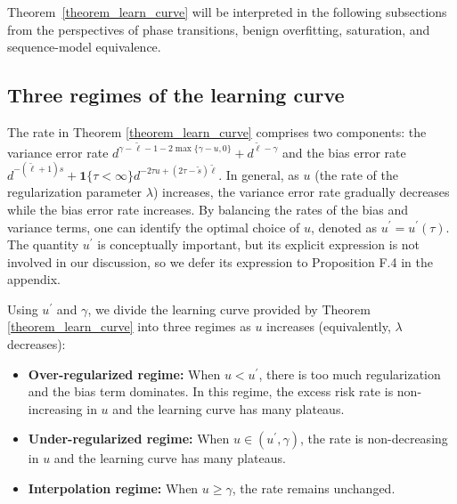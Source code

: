 \documentclass{article}
\theoremstyle{plain}
\theoremstyle{definition}
\theoremstyle{remark}
\begin{document}

Theorem~\ref{theorem_learn_curve} will be interpreted in the following subsections from the perspectives of phase transitions, benign overfitting, saturation, and sequence-model equivalence.


\subsection{Three regimes of the learning curve} 
The rate in Theorem \ref{theorem_learn_curve} comprises two components: the variance error rate $d^{\gamma - \tilde{\ell} - 1 - 2  \max\{\gamma - u, 0\}}
+ d^{\tilde{\ell} - \gamma}$ and the bias error rate $d^{-(\tilde{\ell} + 1)  s}
+ \mathbf{1}\{\tau<\infty\} d^{-2  \tau  u + (2  \tau - \tilde{s})  \tilde{\ell}}$.
In general, as $u$ (the rate of the regularization parameter $\lambda$) increases, the variance error rate gradually decreases while the bias error rate increases. 
By balancing the rates of the bias and variance terms, one can identify the optimal choice of $u$, denoted as $u^{\prime} = u^{\prime}(\tau)$. 
The quantity $u^{\prime}$ is conceptually important, but its explicit expression is not involved in our discussion, so we defer its expression to Proposition F.4 in the appendix.  


Using $u^{\prime}$ and $\gamma$, we divide the learning curve provided by Theorem \ref{theorem_learn_curve} into three regimes as $u$ increases (equivalently, $\lambda$ decreases):
\begin{itemize}
    \item {\bf Over-regularized regime: } When $u < u^{\prime}$, there is too much regularization and the bias term dominates. In this regime, the excess risk rate is non-increasing in $u$ and the learning curve has many plateaus.
    
    \vspace{3pt}
    
    \item {\bf Under-regularized regime: } When $u \in (u^{\prime}, \gamma)$, 
    the rate is non-decreasing in $u$ and the learning curve has many plateaus.

    \vspace{3pt}
    
    \item {\bf Interpolation regime: } When $u \geq \gamma$, the rate remains unchanged.
\end{itemize}
\end{document}
